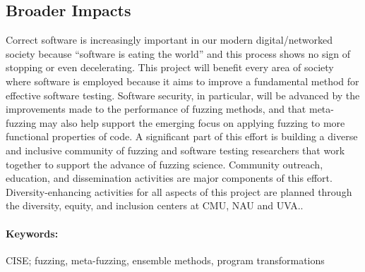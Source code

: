 \subsection*{Broader Impacts}
\vspace{-2mm}
Correct software is increasingly important in our modern digital/networked 
society because ``software is eating the world'' and this process shows no sign 
of stopping or even decelerating. 
This project will benefit every area of society where software is employed because it aims to improve a fundamental method for effective software testing.
Software security, in particular, will be advanced by the 
improvements made to the performance of fuzzing methods, and that meta-fuzzing 
may also help support the emerging focus on applying fuzzing to more functional 
properties of code.
A significant part of this effort is building a diverse and inclusive community of fuzzing and software testing researchers that work together to support the advance of fuzzing science. 
Community outreach, education, and dissemination activities are major components of this effort.
Diversity-enhancing activities for all aspects of this project are planned through the diversity, equity, and inclusion centers at CMU, NAU and UVA..

\paragraph{Keywords:}
CISE; fuzzing, meta-fuzzing, ensemble methods, program transformations
